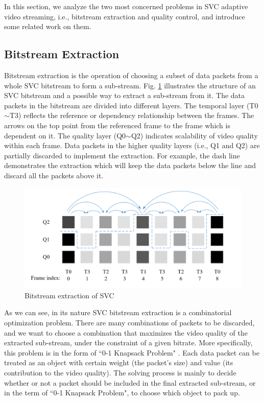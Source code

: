 \documentclass[journal]{IEEEtran}
\begin{document}
In this section, we analyze the two most concerned problems in SVC adaptive video streaming, i.e., bitstream extraction and quality control, and introduce some related work on them.

\subsection{Bitstream Extraction}
\label{subsec:analysis-extraction}

Bitstream extraction is the operation of choosing a subset of data packets from a whole SVC bitstream to form a sub-stream. Fig. \ref{fig:Bitstream-Extraction} illustrates the structure of an SVC bitstream and a possible way to extract a sub-stream from it. The data packets in the bitstream are divided into different layers. The temporal layer (T0$\sim$T3) reflects the reference or dependency relationship between the frames. The arrows on the top point from the referenced frame to the frame which is dependent on it. The quality layer (Q0$\sim$Q2) indicates scalability of video quality within each frame. Data packets in the higher quality layers (i.e., Q1 and Q2) are partially discarded to implement the extraction. For example, the dash line demonstrates the extraction which will keep the data packets below the line and discard all the packets above it. 

\begin{figure}[h]
\centering
\includegraphics[width = 1.0\linewidth]{Bitstream-Extraction.jpg}
\caption{Bitstream extraction of SVC \label{fig:Bitstream-Extraction}}
\end{figure}

As we can see, in its nature SVC bitstream extraction is a combinatorial optimization problem. There are many combinations of packets to be discarded, and we want to choose a combination that maximizes the video quality of the extracted sub-stream, under the constraint of a given bitrate. More specifically, this problem is in the form of ``0-1 Knapsack Problem" \cite{Knapsack}. Each data packet can be treated as an object with certain weight (the packet's size) and value (its contribution to the video quality). The solving process is mainly to decide whether or not a packet should be included in the final extracted sub-stream, or in the term of ``0-1 Knapsack Problem", to choose which object to pack up.
\end{document}

